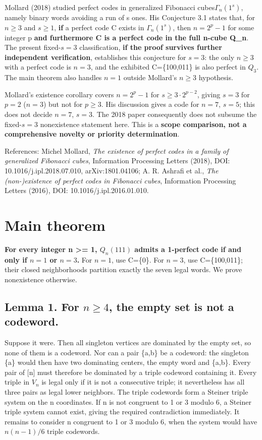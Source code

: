 \documentclass[
  11pt,
]{article}
\begin{document}
Mollard (2018) studied perfect codes in generalized Fibonacci
cubes\(\Gamma_n(1^s)\), namely binary words avoiding a run of s ones.
His Conjecture 3.1 states that, for \(n\ge 3\) and \(s\ge 1\),
\textbf{if} a perfect code C exists in \(\Gamma_n(1^s)\), then
\(n=2^p-1\) for some integer p \textbf{and furthermore C is a perfect
code in the full n-cube Q\_n}. The present fixed-\(s=3\) classification,
\textbf{if the proof survives further independent verification},
establishes this conjecture for \(s=3\): the only \(n\ge 3\) with a
perfect code is \(n=3\), and the exhibited C=\{100,011\} is also perfect
in \(Q_3\). The main theorem also handles \(n=1\) outside Mollard's
\(n\ge 3\) hypothesis.

Mollard's existence corollary covers \(n=2^p-1\) for
\(s\ge 3\cdot 2^{p-2}\), giving \(s=3\) for \(p=2\) (\(n=3\)) but not for
\(p\ge 3\). His discussion gives a code for \(n=7\), \(s=5\); this does
not decide \(n=7\), \(s=3\). The 2018 paper consequently does not
subsume the fixed-\(s=3\) nonexistence statement here. This is a
\textbf{scope comparison, not a comprehensive novelty or priority
determination}.

References: Michel Mollard, \emph{The existence of perfect codes in a
family of generalized Fibonacci cubes}, Information Processing Letters
(2018), DOI: 10.1016/j.ipl.2018.07.010, arXiv:1801.04106; A. R. Ashrafi
et al., \emph{The (non-)existence of perfect codes in Fibonacci cubes},
Information Processing Letters (2016), DOI: 10.1016/j.ipl.2016.01.010.

\section{Main theorem}\label{main-theorem}

\textbf{For every integer n \textgreater= 1, \(Q_n(111)\) admits a
1-perfect code if and only if \(n=1\) or \(n=3\).} For \(n=1\), use
C=\{0\}. For \(n=3\), use C=\{100,011\}; their closed neighborhoods
partition exactly the seven legal words. We prove nonexistence
otherwise.

\subsection{\texorpdfstring{Lemma 1. For \(n\ge 4\), the empty set is
not a
codeword.}{Lemma 1. For n\textbackslash ge 4, the empty set is not a codeword.}}\label{lemma-1.-for-nge-4-the-empty-set-is-not-a-codeword.}

Suppose it were. Then all singleton vertices are dominated by the empty
set, so none of them is a codeword. Nor can a pair \{a,b\} be a
codeword: the singleton \{a\} would then have two dominating centers,
the empty word and \{a,b\}. Every pair of {[}n{]} must therefore be
dominated by a triple codeword containing it. Every triple in \(V_n\) is
legal only if it is not a consecutive triple; it nevertheless has all
three pairs as legal lower neighbors. The triple codewords form a
Steiner triple system on the n coordinates. If n is not congruent to 1
or 3 modulo 6, a Steiner triple system cannot exist, giving the required
contradiction immediately. It remains to consider n congruent to 1 or 3
modulo 6, when the system would have \(n(n-1)/6\) triple codewords.
\end{document}
